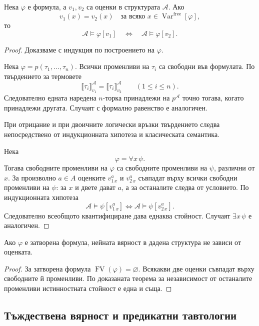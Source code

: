 \begin{keythm}
Нека $\varphi$ е формула, а $v_1,v_2$ са оценки в структурата $\mathcal A$. Ако
\[
v_1(x)=v_2(x)
\quad\text{за всяко }
x\in\operatorname{Var}^{\mathrm{free}}[\varphi],
\]
то
\[
\mathcal A\models\varphi[v_1]
\quad\Longleftrightarrow\quad
\mathcal A\models\varphi[v_2].
\]
\end{keythm}

\begin{proof}
Доказваме с индукция по построението на $\varphi$.

Нека $\varphi=p(\tau_1,\ldots,\tau_n)$. Всички променливи на $\tau_i$ са свободни във формулата. По твърдението за термовете
\[
\llbracket\tau_i\rrbracket^{\mathcal A}_{v_1}
=
\llbracket\tau_i\rrbracket^{\mathcal A}_{v_2}
\qquad (1\leq i\leq n).
\]
Следователно едната наредена $n$-торка принадлежи на $p^{\mathcal A}$ точно тогава, когато принадлежи другата. Случаят с формално равенство е аналогичен.

При отрицание и при двоичните логически връзки твърдението следва непосредствено от индукционната хипотеза и класическата семантика.

Нека
\[
\varphi=\forall x\,\psi.
\]
Тогава свободните променливи на $\varphi$ са свободните променливи на $\psi$, различни от $x$. За произволно $a\in A$ оценките $v_{1\,x}^a$ и $v_{2\,x}^a$ съвпадат върху всички свободни променливи на $\psi$: за $x$ и двете дават $a$, а за останалите следва от условието. По индукционната хипотеза
\[
\mathcal A\models\psi[v_{1\,x}^a]
\Longleftrightarrow
\mathcal A\models\psi[v_{2\,x}^a].
\]
Следователно всеобщото квантифициране дава еднаква стойност. Случаят $\exists x\,\psi$ е аналогичен.
\end{proof}

\begin{cor}
Ако $\varphi$ е затворена формула, нейната вярност в дадена структура не зависи от оценката.
\end{cor}

\begin{proof}
За затворена формула $\operatorname{FV}(\varphi)=\varnothing$. Всякакви две оценки съвпадат върху свободните й променливи. По доказаната теорема за независимост от останалите променливи истинностната стойност е една и съща.
\end{proof}

\subsection{Тъждествена вярност и предикатни тавтологии}\label{s:21.3.3}

